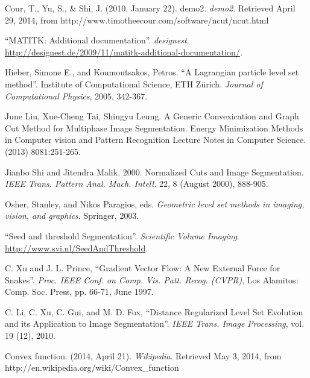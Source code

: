 \documentclass{article}
\begin{document}
\clearpage
\begin{thebibliography}{9}
\fontsize{10pt}{12pt}\selectfont
\raggedright

        Cour, T., Yu, S., \& Shi, J. (2010, January 22). demo2. \emph{demo2}. Retrieved April 29, 2014, from http://www.timotheecour.com/software/ncut/ncut.html

        ``MATITK: Additional documentation''.
        \emph{designest}.
        \url{http://designest.de/2009/11/matitk-additional-documentation/}.

        Hieber, Simone E., and Koumoutsakos, Petros.
        ``A Lagrangian particle level set method''.
        Institute of Computational Science, ETH Zürich.
        \emph{Journal of Computational Physics}, 2005, 342-367.

        June Liu, Xue-Cheng Tai, Shingyu Leung. A Generic Convexication and Graph Cut Method for Multiphase Image Segmentation. Energy Minimization Methods in Computer vision and Pattern Recognition Lecture Notes in Computer Science. (2013) 8081:251-265.

        Jianbo Shi and Jitendra Malik. 2000. Normalized Cuts and Image Segmentation. \emph{IEEE Trans. Pattern Anal. Mach. Intell.} 22, 8 (August 2000), 888-905.

        Osher, Stanley, and Nikos Paragios, eds. 
        \emph{Geometric level set methods in imaging, vision, and graphics}.
        Springer, 2003.

        ``Seed and threshold Segmentation''.
        \emph{Scientific Volume Imaging}.
        \url{http://www.svi.nl/SeedAndThreshold}.

        C. Xu and J. L. Prince, ``Gradient Vector Flow: A New External Force for Snakes''.
        \emph{Proc. IEEE Conf. on Comp. Vis. Patt. Recog. (CVPR)}, 
        Los Alamitos: Comp. Soc. Press, pp. 66-71, June 1997.

        C. Li, C. Xu, C. Gui, and M. D. Fox, 
        ``Distance Regularized Level Set Evolution and its Application to Image Segmentation''.
        \emph{IEEE Trans. Image Processing}, 
        vol. 19 (12), 2010.
        
        Convex function. (2014, April 21). \emph{Wikipedia}. Retrieved May 3, 2014, from http://en.wikipedia.org/wiki/Convex\_function        

\end{thebibliography}


\end{document}

